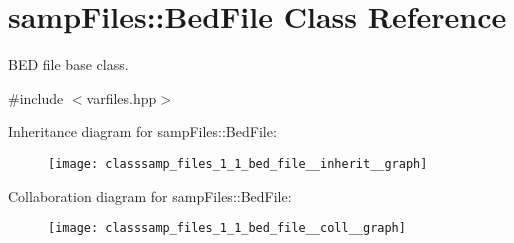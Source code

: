 \hypertarget{classsamp_files_1_1_bed_file}{}\section{samp\+Files\+:\+:Bed\+File Class Reference}
\label{classsamp_files_1_1_bed_file}


B\+ED file base class.  




{\ttfamily \#include $<$varfiles.\+hpp$>$}



Inheritance diagram for samp\+Files\+:\+:Bed\+File\+:\nopagebreak
\begin{figure}[H]
\begin{center}
\leavevmode
\texttt{[image: classsamp\_files\_1\_1\_bed\_file\_\_inherit\_\_graph]}
\end{center}
\end{figure}


Collaboration diagram for samp\+Files\+:\+:Bed\+File\+:\nopagebreak
\begin{figure}[H]
\begin{center}
\leavevmode
\texttt{[image: classsamp\_files\_1\_1\_bed\_file\_\_coll\_\_graph]}
\end{center}
\end{figure}
